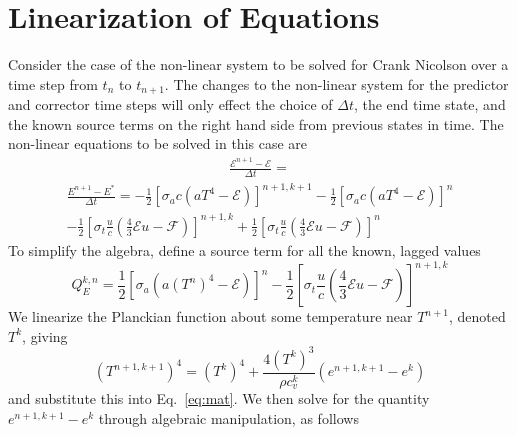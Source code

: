 \documentclass[preprint,12pt]{elsarticle}
\newcommand{\ER}{\mathcal{E}}
\newcommand{\FR}{\mathcal{F}}
\newcommand{\Dt}{\Delta t}
\newcommand{\sa}{\sigma_a}
\newcommand{\CN}[3]{\frac{1}{2}\left[ #1 \right]^{#3} + \frac{1}{2} \left[ #1
\right]^{#2}}
\newcommand{\CNN}[3]{-\frac{1}{2}\left[ #1 \right]^{#3} - \frac{1}{2} \left[ #1
\right]^{#2}}
\begin{document}
\clearpage
\section{Linearization of Equations}

Consider the case of the non-linear system to be solved for Crank Nicolson over a
time step from $t_n$ to $t_{n+1}$.  The changes to the non-linear system for the
predictor and corrector time steps will only effect the choice of $\Delta t$, the end time state, and the known source
terms on the right hand side from previous states in time.  The non-linear equations
to be solved in this case are
\begin{multline}
    \frac{\ER^{n+1} - \ER}{\Dt} =  
\end{multline}
\begin{multline}
    \frac{E^{n+1}-E^*}{\Dt} = \CNN{\sigma_a c \left( aT^4 - \ER
\right)}{n}{n+1,k+1} \\ - \CN{\sigma_t \frac{u}{c} \left( \frac{4}{3} \ER u - \FR
\right)}{n}{n+1,k}
\label{eq:mat}
\end{multline}
To simplify the algebra, define a source term for all the known, lagged values
\begin{equation}
    Q_E^{k,n} = \frac{1}{2}\left[\sa\left( a(T^n)^4 - \ER\right)\right]^n -
    \frac{1}{2}\left[\sigma_t \frac{u}{c} \left( \frac{4}{3} \ER u - \FR\right)\right]^{n+1,k}
\end{equation}
We linearize the Planckian function about some temperature near $T^{n+1}$, denoted
$T^k$, giving
\begin{equation}
    \left( T^{n+1,k+1} \right)^4 = (T^k)^4 + \frac{4(T^k)^3}{\rho c_v^k}\left(
    e^{n+1,k+1} - e^{k}  \right)
    \label{eq:linearize}
\end{equation}
and substitute this into Eq.~\eqref{eq:mat}.  We then solve for the quantity
$e^{n+1,k+1} - e^{k}$ through algebraic manipulation, as follows












\end{document}
